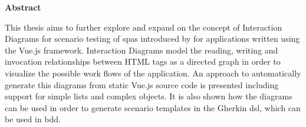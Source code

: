 \thispagestyle{empty}
\begin{center}
    
    \vspace{0.9cm}
    \large{}
    \textbf{Abstract}

\end{center}
\begin{center}
\vspace{0.3cm}
\large{}
\vspace{0.4cm}
This thesis aims to further explore and expand on the concept of Interaction Diagrams for scenario testing of \glspl{spa} introduced by \cite{zhang2019scenario} for applications written using the Vue.js framework. Interaction Diagrams model the reading, writing and invocation relationships between HTML tags as a directed graph in order to visualize the possible work flows of the application. An approach to automatically generate this diagrams from static Vue.js source code is presented including support for simple lists and complex objects. It is also shown how the diagrams can be used in order to generate scenario templates in the Gherkin \gls{dsl}, which can be used in \gls{bdd}.
\end{center}